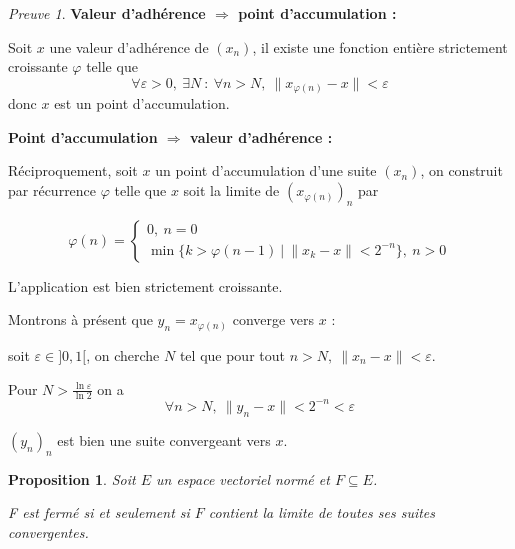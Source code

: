 \documentclass[]{article}
\newtheorem{myproposition}{Proposition}
\theoremstyle{remark}
\newtheorem{myproof}{Preuve}
\theoremstyle{definition}
\newenvironment{proofpart}[1]{
	\noindent
	{\textbf{\boldmath #1}}
}{
	\checkmark
}
\begin{document}
\begin{myproof}
	\begin{proofpart}{Valeur d'adhérence $\Longrightarrow$ point d'accumulation :}
	
		Soit $x$ une valeur d'adhérence de $(x_n)$, il existe une fonction entière strictement croissante $\varphi$ telle que $$\forall \varepsilon > 0, ~ \exists N ~ : ~ \forall n > N, ~ \|x_{\varphi(n)}-x\| < \varepsilon$$
		donc $x$ est un point d'accumulation.
	\end{proofpart}
	
	\begin{proofpart}{Point d'accumulation $\Longrightarrow$ valeur d'adhérence :}
		Réciproquement, soit $x$ un point d'accumulation d'une suite $(x_n)$, on construit par récurrence $\varphi$ telle que $x$ soit la limite de $(x_{\varphi(n)})_n$ par 
		
		$$
		\varphi(n) = \left\{
			\begin{array}{ll}
				0, ~ n = 0 \\
				\min\{k > \varphi(n-1) ~ | ~ \|x_k-x\| < 2^{-n}\}, ~ n > 0
			\end{array}
		\right.
		$$
		
		L'application est bien strictement croissante.
		
		Montrons à présent que $y_n=x_{\varphi(n)}$ converge vers $x$ : 
		
		soit $\varepsilon \in ]0, 1[$, on cherche $N$ tel que pour tout $n > N, ~ \|x_n-x\| < \varepsilon$.
		
		Pour $N > \frac{\ln \varepsilon}{\ln 2}$ on a $$\forall n > N, ~ \|y_n-x\| < 2^{-n} < \varepsilon$$
		
		$(y_n)_n$ est bien une suite convergeant vers $x$.
	\end{proofpart}
	
\end{myproof}

\begin{myproposition}
	Soit $E$ un espace vectoriel normé et $F \subseteq E$.
	
	F est fermé \textit{si et seulement si} $F$ contient la limite de toutes ses suites convergentes.
\end{myproposition}
\end{document}
